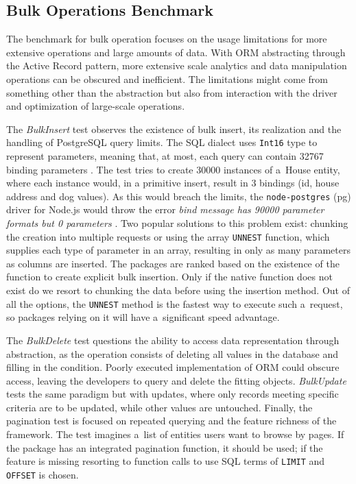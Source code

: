 \subsection*{Bulk Operations Benchmark}
The benchmark for bulk operation focuses on the usage limitations for more
extensive operations and large amounts of data. With ORM abstracting through the
Active Record pattern, more extensive scale analytics and data manipulation
operations can be obscured and inefficient. The limitations might come from
something other than the abstraction but also from interaction with the driver
and optimization of large-scale operations.

The \textit{BulkInsert} test observes the existence of bulk insert, its
realization and the handling of PostgreSQL query limits. The SQL dialect uses
\texttt{Int16} type to represent parameters, meaning that, at most, each query
can contain 32767 binding parameters \cite{postgresMessageFormats}. The test
tries to create 30000 instances of a~House entity, where each instance would, in
a primitive insert, result in 3 bindings (id, house address and dog values). As
this would breach the limits, the \texttt{node-postgres} (pg) driver for Node.js
would throw the error \textit{bind message has 90000 parameter formats but 0
parameters} \cite{nodePostgresParameterLimit}. Two popular solutions to this
problem exist: chunking the creation into multiple requests or using the array
\texttt{UNNEST} function, which supplies each type of parameter in an array,
resulting in only as many parameters as columns are inserted. The packages are
ranked based on the existence of the function to create explicit bulk insertion.
Only if the native function does not exist do we resort to chunking the data
before using the insertion method. Out of all the options, the \texttt{UNNEST}
method is the fastest way to execute such a~request, so packages relying on it
will have a~significant speed advantage.

The \textit{BulkDelete} test questions the ability to access data representation
through abstraction, as the operation consists of deleting all values in the
database and filling in the condition. Poorly executed implementation of ORM
could obscure access, leaving the developers to query and delete the fitting
objects. \textit{BulkUpdate} tests the same paradigm but with updates, where
only records meeting specific criteria are to be updated, while other values are
untouched. Finally, the pagination test is focused on repeated querying and the
feature richness of the framework. The test imagines a~list of entities users
want to browse by pages. If the package has an integrated pagination function,
it should be used; if the feature is missing resorting to function calls to use
SQL terms of \texttt{LIMIT} and \texttt{OFFSET} is chosen.
